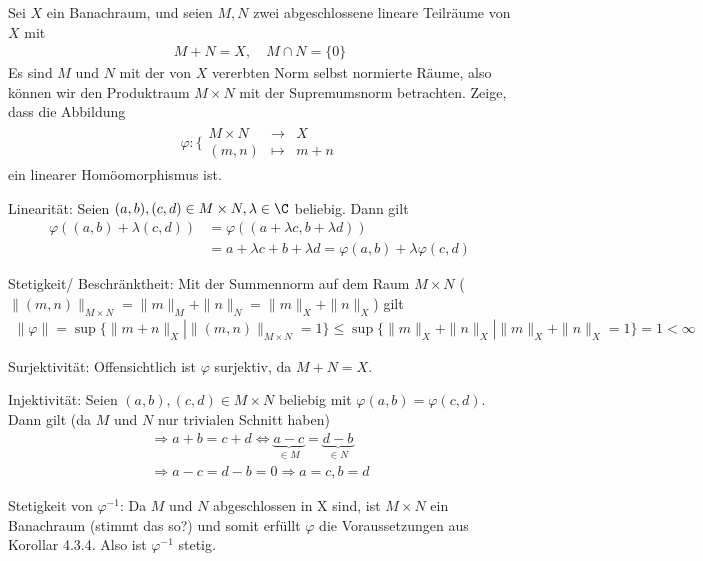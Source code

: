 \begin{exercise}
Sei $X$ ein Banachraum, und seien $M,N$ zwei abgeschlossene lineare Teilräume von $X$ mit
\begin{align*}
  M + N = X, \quad M \cap N = \{0\}
\end{align*}
Es sind $M$ und $N$ mit der von $X$ vererbten Norm selbst normierte Räume, also
können wir den Produktraum $M \times N$ mit der Supremumsnorm betrachten. Zeige,
dass die Abbildung
\begin{align*}
  \varphi: \bigg\{\begin{matrix}
    M \times N &\rightarrow& X \\
    (m,n) &\mapsto& m + n
  \end{matrix}
\end{align*}
ein linearer Homöomorphismus ist.
\end{exercise}
\begin{solution}
\item Linearität:
Seien $(a,b),(c,d)\in M\times N, \lambda \in \C $ beliebig. Dann gilt
\begin{align*}
  \varphi((a,b)+\lambda (c,d)) &= \varphi ((a+\lambda c, b + \lambda d)) \\
  &= a+\lambda c +  b + \lambda d = \varphi (a,b) + \lambda \varphi (c,d)
\end{align*}
 \item Stetigkeit/ Beschränktheit:
 Mit der Summennorm auf dem Raum $M \times N$ ($\|(m,n)\|_{M \times N} = \|m\|_M + \|n\|_N = \|m\|_X + \|n\|_X$) gilt
 \begin{align*}
      \|\varphi\| = \sup\{\|m+n\|_X | \|(m,n)\|_{M \times N} = 1\} \leq \sup\{\|m\|_X + \|n\|_X | \|m\|_X + \|n\|_X = 1\} = 1 < \infty
 \end{align*}

 \item Surjektivität:
 Offensichtlich ist $\varphi$ surjektiv, da $M + N = X$.

 \item Injektivität:
 Seien $(a,b),(c,d)\in M\times N$ beliebig mit $\varphi (a,b) = \varphi (c,d)$. Dann gilt (da $M$ und $N$ nur trivialen Schnitt haben)
 \begin{align*}
    \Rightarrow a+b = c+d \Leftrightarrow \underbrace{a-c}_{\in M} = \underbrace{d-b}_{\in N} \\
    \Rightarrow a-c = d-b = 0 \Rightarrow a=c, b=d
 \end{align*}

 \item Stetigkeit von $\varphi^{-1}$:
 Da $M$ und $N$ abgeschlossen in X sind, ist $M \times N$ ein Banachraum (stimmt das so?) und somit erfüllt $\varphi$ die Voraussetzungen aus Korollar 4.3.4. Also ist $\varphi^{-1}$ stetig.

\end{solution}
